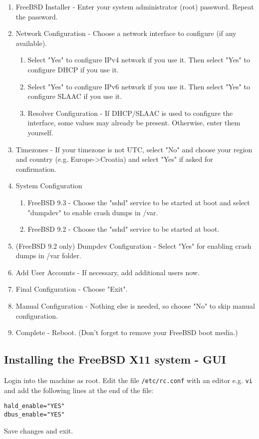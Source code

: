 \begin{enumerate}
\item FreeBSD Installer - Enter your system administrator (root) password. Repeat the password.
\item Network Configuration - Choose a network interface to configure (if any available).
	\begin{enumerate}
	\item Select "Yes" to configure IPv4 network if you use it. Then select "Yes" to configure DHCP if you use it.
	\item Select "Yes" to configure IPv6 network if you use it. Then select "Yes" to configure SLAAC if you use it.
	\item Resolver Configuration - If DHCP/SLAAC is used to configure the interface, some values may already be present. Otherwise, enter them yourself.
	\end{enumerate}
\item Timezones - If your timezone is not UTC, select "No" and choose your region and country (e.g. Europe->Croatia) and select "Yes" if asked for confirmation.
\item System Configuration
	\begin{enumerate}
		\item FreeBSD 9.3 - Choose the "sshd" service to be started at boot and select "dumpdev" to enable crash dumps in /var.
		\item FreeBSD 9.2 - Choose the "sshd" service to be started at boot.
	\end{enumerate}
\item (FreeBSD 9.2 only) Dumpdev Configuration - Select "Yes" for enabling crash dumps in /var folder.
\item Add User Accounts - If necessary, add additional users now.
\item Final Configuration - Choose "Exit".
\item Manual Configuration - Nothing else is needed, so choose "No" to skip manual configuration.
\item Complete - Reboot. (Don't forget to remove your FreeBSD boot media.)
\end{enumerate}

\subsection{Installing the FreeBSD X11 system - GUI}

Login into the machine as root. Edit the file \texttt{/etc/rc.conf} with an editor e.g.
\texttt{vi} and add the following lines at the end of the file:
\begin{verbatim}
hald_enable="YES"
dbus_enable="YES"
\end{verbatim}
Save changes and exit.

